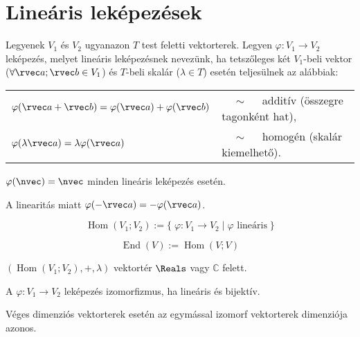 \clearpage
\section{Lineáris leképezések}\label{sec-01-04}

\begin{definition}
  Legyenek $V_1$ és $V_2$ ugyanazon $T$ test feletti vektorterek. Legyen
  $\varphi: V_1 \rightarrow V_2$ leképezés, melyet lineáris leképezésnek
  nevezünk, ha tetszőleges két $V_1$-beli vektor ($\forall \rvec a; \rvec b \in
    V_1$) és $T$-beli skalár ($\lambda \in T$) esetén teljesülnek az alábbiak:

  \def\arraystretch{1.5}
  \begin{tabular}{>{\bullet\;}l>{$\quad \sim \quad$}l}
    $\varphi(\rvec a + \rvec b) = \varphi(\rvec a) + \varphi(\rvec b)$
     & additív (összegre tagonként hat), \\
    $\varphi(\lambda \rvec a) = \lambda \varphi(\rvec a)$
     & homogén (skalár kiemelhető).
  \end{tabular}
\end{definition}

\begin{note}
  $\varphi(\nvec) = \nvec$ minden lineáris leképezés esetén.

  A linearitás miatt $\varphi(-\rvec a) = - \varphi(\rvec a)$.
\end{note}

\begin{definition}[Homomorfizmus]
  $$
    \operatorname{Hom} (V_1; V_2) := \big\{\;
    \varphi: V_1 \to V_2 \; \big| \; \varphi \text{ lineáris}
    \;\big\}
  $$
\end{definition}

\begin{definition}[Endomorfizmus]
  $$
    \operatorname{End} (V) := \operatorname{Hom} (V; V)
  $$
\end{definition}

\begin{statement}
  $(\operatorname{Hom} (V_1; V_2), +, \lambda)$  vektortér $\Reals$ vagy
  $\mathbb C$ felett.
\end{statement}

\begin{definition}[Izomorfizmus]
  A $\varphi: V_1 \to V_2$ leképezés izomorfizmus, ha lineáris és bijektív.
\end{definition}

\begin{statement}
  Véges dimenziós vektorterek esetén az egymással izomorf vektorterek dimenziója
  azonos.
\end{statement}


